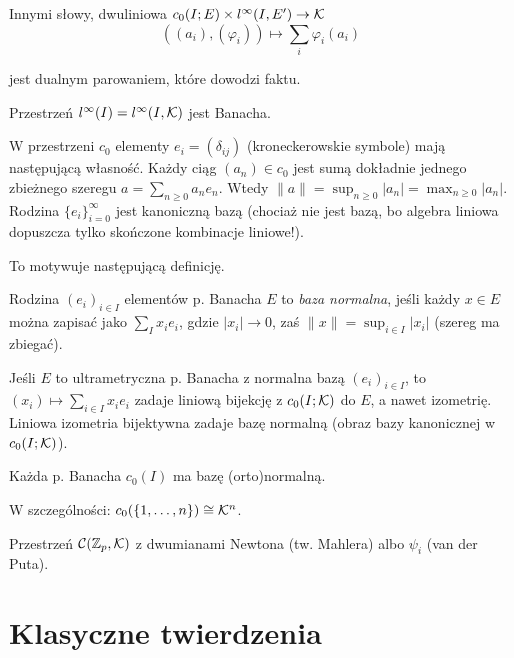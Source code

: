 Innymi słowy, dwuliniowa $c_0(I; E) \times l^\infty(I, E') \to \mathcal K$
\[
	((a_i), (\varphi_i)) \mapsto \sum_i \varphi_i(a_i)
\]

jest dualnym parowaniem, które dowodzi faktu.

\begin{wniosek}
	Przestrzeń $l^\infty(I) = l^\infty(I, \mathcal K)$ jest Banacha.
\end{wniosek}

W przestrzeni $c_0$ elementy $e_i = (\delta_{ij})$ (kroneckerowskie symbole) mają następującą własność.
Każdy ciąg $(a_n) \in c_0$ jest sumą dokładnie jednego zbieżnego szeregu $a = \sum_{n \ge 0} a_ne_n$.
Wtedy $\|a\| = \sup_{n \ge 0} |a_n| = \max_{n \ge 0} |a_n|$.
Rodzina $\{e_i\}_{i = 0}^\infty$ jest kanoniczną bazą (chociaż nie jest bazą, bo algebra liniowa dopuszcza tylko skończone kombinacje liniowe!).

To motywuje następującą definicję.

\begin{definicja}
	Rodzina $(e_i)_{i \in I}$ elementów p. Banacha $E$ to \emph{baza normalna}, jeśli każdy $x \in E$ można zapisać jako $\sum_I x_i e_i$, gdzie $|x_i| \to 0$, zaś $\|x\| = \sup_{i \in I} |x_i|$ (szereg ma zbiegać).
\end{definicja}

\begin{fakt}
	Jeśli $E$ to ultrametryczna p. Banacha z normalna bazą $(e_i)_{i \in I}$, to $(x_i) \mapsto \sum_{i \in I} x_i e_i$ zadaje liniową bijekcję z $c_0(I; \mathcal K)$ do $E$, a nawet izometrię.
	Liniowa izometria bijektywna zadaje bazę normalną (obraz bazy kanonicznej w $c_0(I; \mathcal K)$).
\end{fakt}

\begin{przyklad}
	Każda p. Banacha $c_0(I)$ ma bazę (orto)normalną.
\end{przyklad}

\begin{przyklad}
	W szczególności: $c_0(\{1, \ldots, n\}) \cong \mathcal K^n$.
\end{przyklad}

\begin{przyklad}
	Przestrzeń $\mathcal C(\mathbb Z_p, \mathcal K)$ z dwumianami Newtona (tw. Mahlera) albo $\psi_i$ (van der Puta).
\end{przyklad}

\section{Klasyczne twierdzenia}

